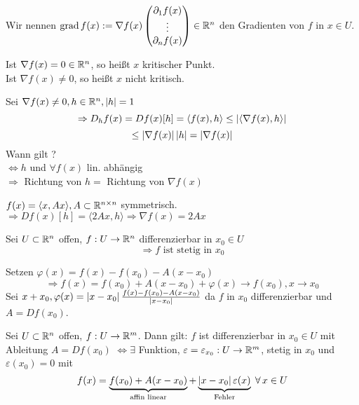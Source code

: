 \documentclass[../ana2.tex]{subfiles}
\begin{document}
\begin{defi}
    Wir nennen \( \operatorname{grad} f(x) := \nabla f(x) \begin{pmatrix}
        \partial_1 f(x) \\
        \vdots \\
        \partial_n f(x)
    \end{pmatrix} \in \mathbb{R}^n \) den Gradienten von \(f\) in 
    \( x \in U \).

    Ist \( \nabla f(x) = 0 \in \mathbb{R}^n \), so heißt \(x\) 
    kritischer Punkt.\\
    Ist \( \nabla f(x) \neq 0 \), so heißt \(x\) 
    nicht kritisch.
\end{defi}
Sei \( \nabla f(x) \neq 0, h \in \mathbb{R}^n, \left|h\right| = 1 \)
\[ \Rightarrow D_hf(x) = Df(x)[h] = \langle f(x), h \rangle 
\leq \left|\langle \nabla f(x), h \rangle\right| \]
\[ \leq \left|\nabla f(x)\right| \left|h\right| = \left|\nabla f(x)\right| \]
Wann gilt \gqq{\(=\)}?\\
\( \Leftrightarrow h \) und \( \forall f(x) \) lin. abhängig \\
\( \Rightarrow \) Richtung von \(h = \) Richtung von 
\( \nabla f(x) \)
\begin{bsp}
    \( f(x) = \langle x, Ax \rangle, A \subset \mathbb{R}^{n \times n} \)
    symmetrisch. \\
    \( \Rightarrow Df(x)[h] = \langle 2Ax, h \rangle
    \Rightarrow \nabla f(x) = 2Ax \)
\end{bsp}
\begin{satz}
    Sei \(U \subset \mathbb{R}^n\) offen, \( f:U\rightarrow \mathbb{R}^n \)
    differenzierbar in \( x_0 \in U \)
    \[ \Rightarrow f \text{ ist stetig in } x_0 \]
\end{satz}
\begin{bew}
    Setzen \( \varphi(x) = f(x) - f(x_0) - A(x - x_0) \)
    \[ \Rightarrow f(x) 
    = f(x_0) + A(x - x_0) + \varphi(x) \rightarrow f(x_0), 
    x\rightarrow x_0 \]
    Sei \( x + x_0, \varphi(x) = 
    \left|x - x_0\right| \frac{f(x) - f(x_0) - A(x - x_0)}{\left|x - x_0\right|} \)
    da \( f \) in \(x_0\) differenzierbar und \(A = D f(x_0)\).
\end{bew}
\begin{lem}
    Sei \( U \subset \mathbb{R}^n\) offen, \(f:U\rightarrow \mathbb{R}^m\).
    Dann gilt:
    \(f\) ist differenzierbar in \(x_0 \in U \) mit Ableitung
    \( A = Df(x_0) \)
    \( \Leftrightarrow \exists \) Funktion, \( \varepsilon = 
    \varepsilon_{x_0}:U\rightarrow \mathbb{R}^m \), stetig in \(x_0\) und
    \(\varepsilon(x_0) = 0\) mit 
    \[ f(x) = \underbrace{f(x_0) + A(x-x_0)}_{\text{affin linear}} 
    + \underbrace{\abs{x-x_0}\varepsilon(x)}_{\text{Fehler}}
    \; \forall x \in U \]
\end{lem}
\end{document}
